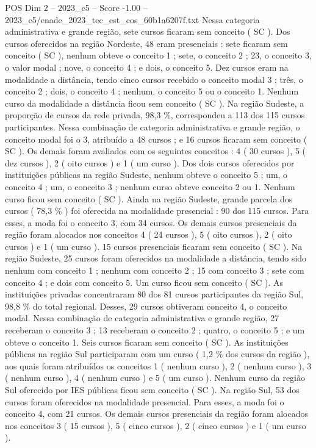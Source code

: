 \begin{textsample}{POS Dim 2 – 2023\_c5 – Score -1.00 – 2023\_c5/enade\_2023\_tec\_est\_cos\_60b1a6207f.txt}
Nessa categoria administrativa e grande região, sete cursos ficaram sem conceito ( SC ).
Dos cursos oferecidos na região Nordeste, 48 eram presenciais : sete ficaram sem conceito ( SC ), nenhum obteve o conceito 1 ; sete, o conceito 2 ; 23, o conceito 3, o valor modal ; nove, o conceito 4 ; e dois, o conceito 5.
Dez cursos eram na modalidade a distância, tendo cinco cursos recebido o conceito modal 3 ; três, o conceito 2 ; dois, o conceito 4 ; nenhum, o conceito 5 ou o conceito 1.
Nenhum curso da modalidade a distância ficou sem conceito ( SC ).
Na região Sudeste, a proporção de cursos da rede privada, 98,3 \%, correspondeu a 113 dos 115 cursos participantes.
Nessa combinação de categoria administrativa e grande região, o conceito modal foi o 3, atribuído a 48 cursos ; e 16 cursos ficaram sem conceito ( SC ).
Os demais foram avaliados com os seguintes conceitos : 4 ( 30 cursos ), 5 ( dez cursos ), 2 ( oito cursos ) e 1 ( um curso ).
Dos dois cursos oferecidos por instituições públicas na região Sudeste, nenhum obteve o conceito 5 ; um, o conceito 4 ; um, o conceito 3 ; nenhum curso obteve conceito 2 ou 1.
Nenhum curso ficou sem conceito ( SC ).
Ainda na região Sudeste, grande parcela dos cursos ( 78,3 \% ) foi oferecida na modalidade presencial : 90 dos 115 cursos.
Para esses, a moda foi o conceito 3, com 34 cursos.
Os demais cursos presenciais da região foram alocados nos conceitos 4 ( 24 cursos ), 5 ( oito cursos ), 2 ( oito cursos ) e 1 ( um curso ). 15 cursos presenciais ficaram sem conceito ( SC ).
Na região Sudeste, 25 cursos foram oferecidos na modalidade a distância, tendo sido nenhum com conceito 1 ; nenhum com conceito 2 ; 15 com conceito 3 ; sete com conceito 4 ; e dois com conceito 5.
Um curso ficou sem conceito ( SC ).
As instituições privadas concentraram 80 dos 81 cursos participantes da região Sul, 98,8 \% do total regional.
Desses, 29 cursos obtiveram conceito 4, o conceito modal.
Nessa combinação de categoria administrativa e grande região, 27 receberam o conceito 3 ; 13 receberam o conceito 2 ; quatro, o conceito 5 ; e um obteve o conceito 1.
Seis cursos ficaram sem conceito ( SC ).
As instituições públicas na região Sul participaram com um curso ( 1,2 \% dos cursos da região ), aos quais foram atribuídos os conceitos 1 ( nenhum curso ), 2 ( nenhum curso ), 3 ( nenhum curso ), 4 ( nenhum curso ) e 5 ( um curso ).
Nenhum curso da região Sul oferecido por IES públicas ficou sem conceito ( SC ).
Na região Sul, 53 dos cursos foram oferecidos na modalidade presencial.
Para esses, a moda foi o conceito 4, com 21 cursos.
Os demais cursos presenciais da região foram alocados nos conceitos 3 ( 15 cursos ), 5 ( cinco cursos ), 2 ( cinco cursos ) e 1 ( um curso ).

\end{textsample}
